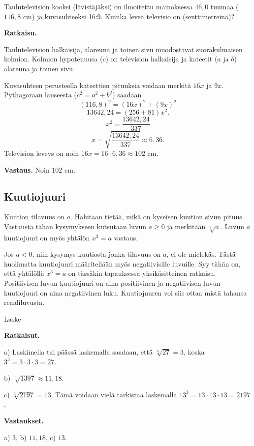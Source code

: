\begin{esimerkki}
Taulutelevision kooksi (lävistäjäksi) on ilmoitettu mainoksessa $46,0$ tuumaa ($116,8$ cm) ja kuvasuhteeksi 16:9. Kuinka leveä televisio on (senttimetreinä)?

{\bf Ratkaisu.}

Taulutelevision halkaisija, alareuna ja toinen sivu muodostavat suorakulmaisen kolmion. Kolmion hypotenuusa ($c$) on television halkaisija ja kateetit ($a$ ja $b$) alareuna ja toinen sivu.

Kuvasuhteen perusteella kateettien pituuksia voidaan merkitä $16x$ ja $9x$. Pythagoraan lauseesta ($c^2 = a^2 + b^2$) saadaan
\[
(116,8)^2 = (16x)^2 + (9x)^2
\]
\[
13642,24 = (256+81)x^2.
\]
\[
x^2 = \frac{13642,24}{337}
\]
\[
x= \sqrt{\frac{13642,24}{337}} \approx 6,36.
\]
Television leveys on noin $16x = 16\cdot 6,36\approx 102$ cm.

{\bf Vastaus.} Noin $102$ cm.
\end{esimerkki}



\subsection*{Kuutiojuuri}

Kuution tilavuus on $a$. Halutaan tietää, mikä on kyseisen kuution sivun pituus. Vastausta tähän kysymykseen kutsutaan luvun $a\ge 0$  ja merkitään $\sqrt[3]{a}$. Luvun $a$ kuutiojuuri on myös yhtälön $x^3 = a$ vastaus.


Jos $a<0$, niin kysymys kuutiosta jonka tilavuus on $a$, ei ole mielekäs. Tästä huolimatta kuutiojuuri määritellään myös negatiivisille luvuille. Syy tähän on, että yhtälöllä $x^3=a$ on tässäkin tapauksessa yksikäsitteinen ratkaisu. Positiivisen luvun kuutiojuuri on aina positiivinen ja negatiivisen luvun kuutiojuuri on aina negatiivinen luku. Kuutiojuuren voi siis ottaa mistä tahansa reaaliluvusta.


\begin{esimerkki}
Laske
\begin{alakohdat}


\end{alakohdat}

{\bf Ratkaisut.}

a)
Laskimella tai päässä laskemalla saadaan, että $\sqrt[3]{27} = 3$, koska  $3^3 =3\cdot 3\cdot 3=27$.

b) 
$\sqrt[3]{1397}\approx 11,18$. 

c)
$\sqrt[3]{2197}=13$.
Tämä voidaan vielä tarkistaa laskemalla $13^3 = 13\cdot 13\cdot 13=2197$.

{\bf Vastaukset.}

a) $3$, b) $11,18$, c) $13$.
\end{esimerkki}


